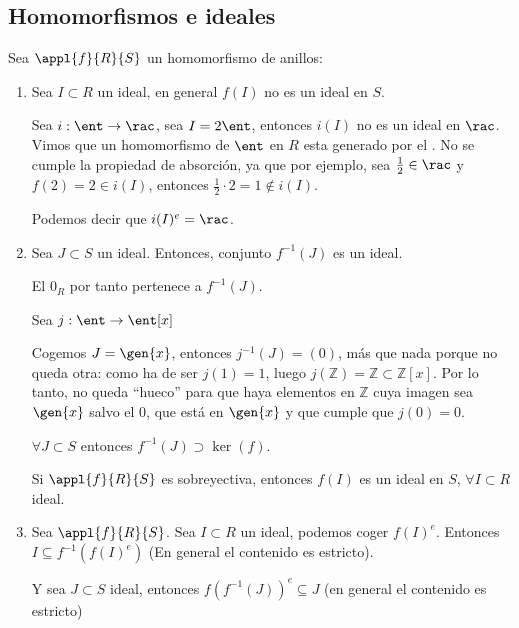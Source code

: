 \subsection{Homomorfismos e ideales}
Sea $\appl{f}{R}{S}$ un homomorfismo de anillos:
\begin{enumerate}
	\item Sea $I \subset R$ un ideal, en general $f(I)$ no es un ideal en $S$.
	\begin{example}
		Sea $i:\ent \rightarrow \rac$, sea $I=2\ent$, entonces $i(I)$ no es un ideal en $\rac$. Vimos que un homomorfismo de $\ent$ en $R$ esta generado por el \one. No se cumple la propiedad de absorción, ya que por ejemplo, sea $\frac{1}{2} \in \rac$ y $f(2)=2 \in i(I)$, entonces $\frac{1}{2}\cdot2=1 \notin i(I)$.

		Podemos decir que $i(I)^e=\rac$.
	\end{example}
	\item Sea $J \subset S$ un ideal. Entonces, conjunto $f^{-1}(J)$ es un ideal.

	El $0_R$ por tanto pertenece a $f^{-1}(J)$.
	\begin{example}
		Sea $j: \ent \rightarrow \ent[x]$

		Cogemos $J=\gen{x}$, entonces $j^{-1}(J)=(0)$, más que nada porque no queda otra: como ha de ser $j(1) = 1$, luego $j(ℤ) = ℤ ⊂ ℤ[x]$. Por lo tanto, no queda ``hueco'' para que haya elementos en $ℤ$ cuya imagen sea $\gen{x}$ salvo el $0$, que está en $\gen{x}$ y que cumple que $j(0) = 0$.
	\end{example}
	\obs $\forall J \subset S$ entonces $f^{-1}(J)\supset \ker(f)$.
	\begin{prop}
		Si $\appl{f}{R}{S}$ es sobreyectiva, entonces $f(I)$ es un ideal en $S$, $\forall I \subset R$ ideal.
	\end{prop}
	\item Sea $\appl{f}{R}{S}$. Sea $I \subset R$ un ideal, podemos coger $f(I)^e$. Entonces $I\subseteq f^{-1}(f(I)^e)$ (En general el contenido es estricto).

	Y sea $J \subset S$ ideal, entonces $f(f^{-1}(J))^e \subseteq J$ (en general el contenido es estricto)
\end{enumerate}

